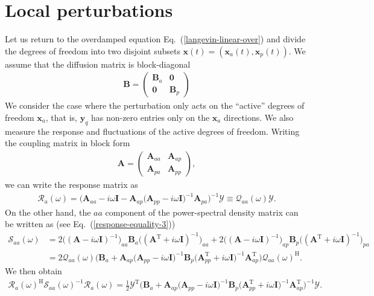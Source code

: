 \documentclass[aps,pre,twocolumn,superscriptaddress,notitlepage]{revtex4-2}
\newcommand{\n}{\nonumber}
\newcommand{\bmc}[1]{\bm{\mathcal{#1}}}
\renewcommand{\eqref}[1]{Eq.~(\ref{#1})}
\begin{document}
\section{Local perturbations}


Let us return to the overdamped equation \eqref{langevin-linear-over} and divide the degrees of freedom into two disjoint subsets $\bm{x}(t) = (\bm{x}_a(t),\bm{x}_p(t))$.
We assume that the diffusion matrix is block-diagonal
\begin{align}
\bm{B} = \begin{pmatrix} \bm{B}_a & \bm{0} \\ \bm{0} & \bm{B}_p \end{pmatrix}
\end{align}
We consider the case where the perturbation only acts on the \enquote{active} degrees of freedom $\bm{x}_a$, that is, $\bm{y}_q$ has non-zero entries only on the $\bm{x}_a$ directions.
We also measure the response and fluctuations of the active degrees of freedom.
Writing the coupling matrix in block form
\begin{align}
\bm{A} = \begin{pmatrix} \bm{A}_{aa} & \bm{A}_{ap} \\ \bm{A}_{pa} & \bm{A}_{pp} \end{pmatrix},
\end{align}
we can write the response matrix as
\begin{align}
\bmc{R}_{a}(\omega) = \Big( \bm{A}_{aa} - i \omega \bm{I} - \bm{A}_{ap} \big( \bm{A}_{pp} - i \omega \bm{I} \big)^{-1} \bm{A}_{pa} \Big)^{-1} \bmc{Y} \equiv \bmc{Q}_{aa}(\omega) \bmc{Y}  \label{response-block-inverse}.
\end{align}
On the other hand, the $aa$ component of the power-spectral density matrix can be written as (see \eqref{response-equality-3})
\begin{align}
\bmc{S}_{aa}(\omega) &= 2 \big(( \bm{A} - i \omega \bm{I} )^{-1} \big)_{aa} \bm{B}_a \big(( \bm{A}^\text{T} + i \omega \bm{I} )^{-1} \big)_{aa} + 2 \big(( \bm{A} - i \omega \bm{I} )^{-1} \big)_{ap} \bm{B}_p \big(( \bm{A}^\text{T} + i \omega \bm{I} )^{-1} \big)_{pa} \\
&= 2 \bmc{Q}_{aa}(\omega) \Big( \bm{B}_a + \bm{A}_{ap} \big(\bm{A}_{pp} - i \omega \bm{I} \big)^{-1} \bm{B}_p \big(\bm{A}_{pp}^\text{T} + i \omega \bm{I} \big)^{-1} \bm{A}_{ap}^\text{T} \Big) \bmc{Q}_{aa}(\omega)^\text{H} \n .
\end{align}
We then obtain
\begin{align}
\bmc{R}_a(\omega)^\text{H} \bmc{S}_{aa}(\omega)^{-1} \bmc{R}_a(\omega) = \frac{1}{2} \bmc{Y}^\text{T} \Big( \bm{B}_a + \bm{A}_{ap} \big(\bm{A}_{pp} - i \omega \bm{I} \big)^{-1} \bm{B}_p \big(\bm{A}_{pp}^\text{T} + i \omega \bm{I} \big)^{-1} \bm{A}_{ap}^\text{T} \Big)^{-1} \bmc{Y} \label{response-equality-4} .
\end{align}
\end{document}
